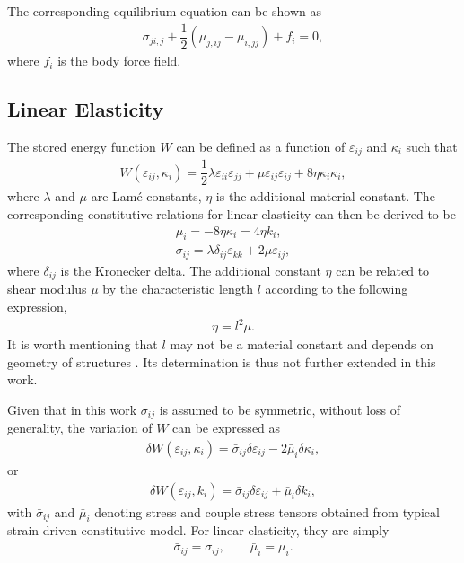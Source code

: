 \documentclass[3p,sort&compress,11pt,fleqn]{elsarticle}
\begin{document}
The corresponding equilibrium equation can be shown as
\begin{gather}\label{eq:equilibrium}
\sigma_{ji,j}+\dfrac{1}{2}\left(\mu_{j,ij}-\mu_{i,jj}\right)+f_i=0,
\end{gather}
where $f_i$ is the body force field.
\subsection{Linear Elasticity}
The stored energy function $W$ can be defined as a function of $\varepsilon_{ij}$ and $\kappa_i$ such that
\begin{gather}\label{eq:stored_energy}
W\left(\varepsilon_{ij},\kappa_i\right)=\dfrac{1}{2}\lambda\varepsilon_{ii}\varepsilon_{jj}+\mu\varepsilon_{ij}\varepsilon_{ij}+8\eta\kappa_i\kappa_i,
\end{gather}
where $\lambda$ and $\mu$ are Lam\'{e} constants, $\eta$ is the additional material constant. The corresponding constitutive relations for linear elasticity can then be derived to be
\begin{gather}\label{eq:constitutive_couple}
\mu_i=-8\eta\kappa_i=4\eta{}k_i,\\
\sigma_{ij}=\lambda\delta_{ij}\varepsilon_{kk}+2\mu\varepsilon_{ij},
\end{gather}
where $\delta_{ij}$ is the Kronecker delta. The additional constant $\eta$ can be related to shear modulus $\mu$ by the characteristic length $l$ according to the following expression,
\begin{gather}
\eta=l^2\mu.
\end{gather}
It is worth mentioning that $l$ may not be a material constant and depends on geometry of structures \citep{Khorshidi2018}. Its determination is thus not further extended in this work.

Given that in this work $\sigma_{ij}$ is assumed to be symmetric, without loss of generality, the variation of $W$ can be expressed as
\begin{gather}\label{eq:potential_energy}
\delta{}W\left(\varepsilon_{ij},\kappa_i\right)=\bar{\sigma}_{ij}\delta\varepsilon_{ij}-2\bar{\mu}_{i}\delta\kappa_i,
\end{gather}
or
\begin{gather}
\delta{}W\left(\varepsilon_{ij},k_i\right)=\bar{\sigma}_{ij}\delta\varepsilon_{ij}+\bar{\mu}_{i}\delta{}k_i,
\end{gather}
with $\bar{\sigma}_{ij}$ and $\bar{\mu}_{i}$ denoting stress and couple stress tensors obtained from typical strain driven constitutive model. For linear elasticity, they are simply
\begin{gather*}
\bar{\sigma}_{ij}=\sigma_{ij},\qquad\bar{\mu}_{i}=\mu_{i}.
\end{gather*}
\end{document}
